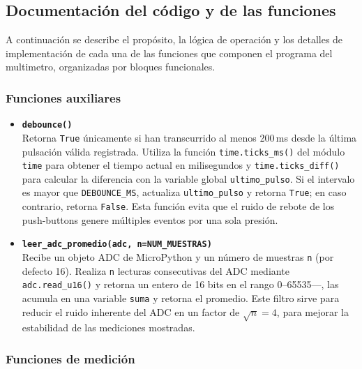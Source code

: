 \documentclass[letterpaper,12pt]{article}
\begin{document}
    

    \subsection{Documentación del código y de las funciones}

    A continuación se describe el propósito, la lógica de operación y los detalles de implementación de cada una de las funciones que componen el programa del multimetro, organizadas por bloques funcionales.

    \subsubsection{Funciones auxiliares}

    \begin{itemize}
        \item \textbf{\texttt{debounce()}} \\
        Retorna \texttt{True} únicamente si han transcurrido al menos 200\,ms desde la última pulsación válida registrada. Utiliza la función \texttt{time.ticks\_ms()} del módulo \texttt{time} para obtener el tiempo actual en milisegundos y \texttt{time.ticks\_diff()} para calcular la diferencia con la variable global \texttt{ultimo\_pulso}. Si el intervalo es mayor que \texttt{DEBOUNCE\_MS}, actualiza \texttt{ultimo\_pulso} y retorna \texttt{True}; en caso contrario, retorna \texttt{False}. Esta función evita que el ruido de rebote de los push-buttons genere múltiples eventos por una sola presión.

        \item \textbf{\texttt{leer\_adc\_promedio(adc, n=NUM\_MUESTRAS)}} \\
        Recibe un objeto ADC de MicroPython y un número de muestras \texttt{n} (por defecto 16). Realiza \texttt{n} lecturas consecutivas del ADC mediante \texttt{adc.read\_u16()} y retorna un entero de 16 bits en el rango 0--65535—, las acumula en una variable \texttt{suma} y retorna el promedio. Este filtro sirve para reducir el ruido inherente del ADC en un factor de $\sqrt{n} = 4$, para mejorar la estabilidad de las mediciones mostradas.
    \end{itemize}

    \subsubsection{Funciones de medición}
\end{document}
